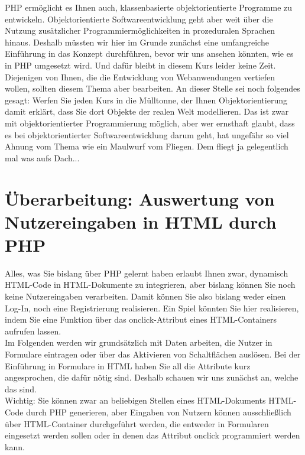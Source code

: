 PHP ermöglicht es Ihnen auch, klassenbasierte objektorientierte Programme zu entwickeln. Objektorientierte Softwareentwicklung geht aber weit über die Nutzung zusätzlicher Programmiermöglichkeiten in prozeduralen Sprachen hinaus. Deshalb müssten wir hier im Grunde zunächst eine umfangreiche Einführung in das Konzept durchführen, bevor wir uns ansehen könnten, wie es in PHP umgesetzt wird. Und dafür bleibt in diesem Kurs leider keine Zeit.\\

Diejenigen von Ihnen, die die Entwicklung von Webanwendungen vertiefen wollen, sollten diesem Thema aber bearbeiten. An dieser Stelle sei noch folgendes gesagt: Werfen Sie jeden Kurs in die Mülltonne, der Ihnen Objektorientierung damit erklärt, dass Sie dort Objekte der realen Welt modellieren. Das ist zwar mit objektorientierter Programmierung möglich, aber wer ernsthaft glaubt, dass es bei objektorientierter Softwareentwicklung darum geht, hat ungefähr so viel Ahnung vom Thema wie ein Maulwurf vom Fliegen. Dem fliegt ja gelegentlich mal was aufs Dach...

\section{Überarbeitung: Auswertung von Nutzereingaben in HTML durch PHP}

Alles, was Sie bislang über PHP gelernt haben erlaubt Ihnen zwar, dynamisch HTML-Code in HTML-Dokumente zu integrieren, aber bislang können Sie noch keine Nutzereingaben verarbeiten. Damit können Sie also bislang weder einen Log-In, noch eine Registrierung realisieren. Ein Spiel könnten Sie hier realisieren, indem Sie eine Funktion über das onclick-Attribut eines HTML-Containers aufrufen lassen.\\

Im Folgenden werden wir grundsätzlich mit Daten arbeiten, die Nutzer in Formulare eintragen oder über das Aktivieren von Schaltflächen auslösen. Bei der Einführung in Formulare in HTML haben Sie all die Attribute kurz angesprochen, die dafür nötig sind. Deshalb schauen wir uns zunächst an, welche das sind.\\

Wichtig: Sie können zwar an beliebigen Stellen eines HTML-Dokuments HTML-Code durch PHP generieren, aber Eingaben von Nutzern können ausschließlich über HTML-Container durchgeführt werden, die entweder in Formularen eingesetzt werden sollen oder in denen das Attribut onclick programmiert werden kann.\\

